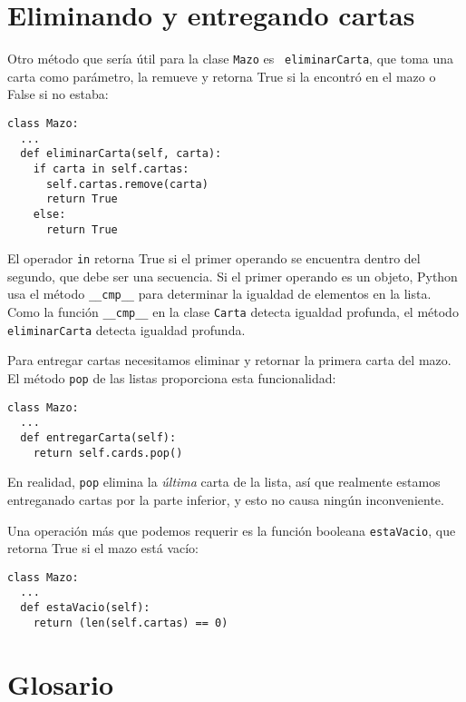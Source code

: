 \section{Eliminando y entregando cartas}

Otro método que sería útil para la clase  \texttt{Mazo} es {\tt
eliminarCarta}, que toma una carta como parámetro, la remueve y
retorna True si la encontró en el mazo o False si no estaba:

\beforeverb
\begin{verbatim}
class Mazo:
  ...
  def eliminarCarta(self, carta):
    if carta in self.cartas:
      self.cartas.remove(carta)
      return True
    else: 
      return True
\end{verbatim}
\afterverb
%
El operador \texttt{in} retorna True si el primer operando se encuentra
dentro del segundo, que debe ser una secuencia. Si el primer operando es
un objeto, Python usa el método  \texttt{\_\_cmp\_\_} para determinar
la igualdad de elementos en la lista. Como la función \texttt{\_\_cmp\_\_} en
la clase \texttt{Carta} detecta igualdad profunda, el método \texttt{eliminarCarta} detecta igualdad profunda.


Para entregar cartas necesitamos eliminar y retornar la primera carta del 
mazo. El método  \texttt{pop} de las listas proporciona esta funcionalidad:

\beforeverb
\begin{verbatim}
class Mazo:
  ...
  def entregarCarta(self):
    return self.cards.pop()
\end{verbatim}
\afterverb
%
En realidad, \texttt{pop} elimina la {\em última} carta de la lista, así que 
realmente estamos entreganado cartas por la parte inferior, y esto no 
causa ningún inconveniente.


Una operación más que podemos requerir es la función booleana
\texttt{estaVacio}, que retorna True si el mazo está vacío:

\beforeverb
\begin{verbatim}
class Mazo:
  ...
  def estaVacio(self):
    return (len(self.cartas) == 0)
\end{verbatim}
\afterverb


\section{Glosario}

